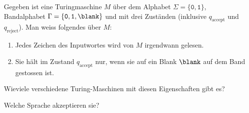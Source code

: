 Gegeben ist eine Turingmaschine $M$ über dem Alphabet
$\Sigma=\{\texttt{0}, \texttt{1}\}$,
Bandalphabet
$\Gamma=\{\texttt{0}, \texttt{1}, \blank\}$
und mit drei Zuständen
(inklusive $q_{\text{accept}}$ und $q_{\text{reject}}$).
Man weiss folgendes über $M$:
\begin{enumerate}
\item\label{50000019:liestalles} Jedes Zeichen des Inputwortes wird
von $M$ irgendwann gelesen.
\item\label{50000019:haeltaufblank} Sie hält im Zustand $q_{\text{accept}}$
nur, wenn sie auf ein Blank $\blank$ auf dem Band gestossen ist.
\end{enumerate}
\begin{teilaufgaben}
\item
Wieviele verschiedene Turing-Maschinen mit diesen Eigenschaften gibt es?
\item
Welche Sprache akzeptieren sie?
\end{teilaufgaben}

